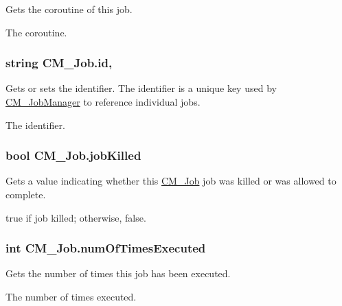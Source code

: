 Gets the coroutine of this job. 

The coroutine.\hypertarget{class_c_m___job_a19b93ec8fb1f643db06e79ad0710732b}{}
\subsubsection[{id}]{\setlength{\rightskip}{0pt plus 5cm}string C\+M\+\_\+\+Job.\+id\hspace{0.3cm}{\ttfamily [get]}, {\ttfamily [set]}}\label{class_c_m___job_a19b93ec8fb1f643db06e79ad0710732b}


Gets or sets the identifier. The identifier is a unique key used by \hyperlink{class_c_m___job_manager}{C\+M\+\_\+\+Job\+Manager} to reference individual jobs. 

The identifier.\hypertarget{class_c_m___job_aa15b9e9cead89bfbd449e0194dc30751}{}
\subsubsection[{job\+Killed}]{\setlength{\rightskip}{0pt plus 5cm}bool C\+M\+\_\+\+Job.\+job\+Killed\hspace{0.3cm}{\ttfamily [get]}}\label{class_c_m___job_aa15b9e9cead89bfbd449e0194dc30751}


Gets a value indicating whether this \hyperlink{class_c_m___job}{C\+M\+\_\+\+Job} job was killed or was allowed to complete. 

{\ttfamily true} if job killed; otherwise, {\ttfamily false}.\hypertarget{class_c_m___job_a042add3b81a210d7a98505bd53765ab5}{}
\subsubsection[{num\+Of\+Times\+Executed}]{\setlength{\rightskip}{0pt plus 5cm}int C\+M\+\_\+\+Job.\+num\+Of\+Times\+Executed\hspace{0.3cm}{\ttfamily [get]}}\label{class_c_m___job_a042add3b81a210d7a98505bd53765ab5}


Gets the number of times this job has been executed. 

The number of times executed.\hypertarget{class_c_m___job_a4d7d6001f3d1153d50f83490fe426925}{}
